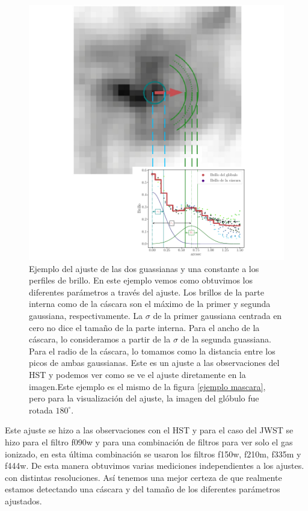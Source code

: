\documentclass{book}
\begin{document}
\begin{figure}[htbp]
    \centering
    \includegraphics[width=\textwidth]{Nuevas imagenes finales/ejemplo_ajuste_2.pdf}
    \caption{Ejemplo del ajuste de las dos guassianas y una constante a los perfiles de brillo. En este ejemplo vemos como obtuvimos los diferentes parámetros a través del ajuste. Los brillos de la parte interna como de la cáscara son el máximo de la primer y segunda gaussiana, respectivamente. La $\sigma$ de la primer gaussiana centrada en cero no dice el tamaño de la parte interna. Para el ancho de la cáscara, lo consideramos a partir de la $\sigma$ de la segunda guassiana. Para el radio de la cáscara, lo tomamos como la distancia entre los picos de ambas gaussianas. Este es un ajuste a las observaciones del HST y podemos ver como se ve el ajuste diretamente en la imagen.Este ejemplo es el mismo de la figura \ref{ejemplo mascara}, pero para la visualización del ajuste, la imagen del glóbulo fue rotada $180^\circ$.}
    \label{ejemplo ajuste}
\end{figure}

Este ajuste se hizo a las observaciones con el HST y para el caso del JWST se hizo para el filtro f090w  y para una combinación de filtros para ver solo el gas ionizado, en esta última combinación se usaron los filtros f150w, f210m, f335m  y f444w. De esta manera obtuvimos varias mediciones independientes a los ajustes. con distintas resoluciones. Así tenemos una mejor certeza de que realmente estamos detectando una cáscara y del tamaño de los diferentes parámetros ajustados.
\newpage
\end{document}
